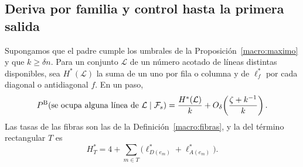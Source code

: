 \subsection{Deriva por familia y control hasta la primera salida}\label{macro:control}

\begin{lema}\label{macro:deriva}
Supongamos que el padre cumple los umbrales de la Proposición~\ref{macro:maximo} y que $k\ge\delta n$.
Para un conjunto $\mathcal L$ de un número acotado de líneas distintas disponibles, sea $H^*(\mathcal
L)$ la suma de un uno por fila o columna y de $\ell_f^*$ por cada diagonal o antidiagonal $f$. En un
paso,
\[
 P^{\rm B}(\text{se ocupa alguna línea de }\mathcal L\mid\mathcal F_s)
 =\frac{H^*(\mathcal L)}{k}
       +O_\delta\!\left(\frac{\zeta+k^{-1}}{k}\right).
\]
Las tasas de las fibras son las de la Definición~\ref{macro:fibras}, y la del término rectangular $T$
es
\[
 H_T^*=4+\sum_{m\in T}\bigl(\ell_{D(e_m)}^*+\ell_{A(e_m)}^*\bigr).
\]
\end{lema}
